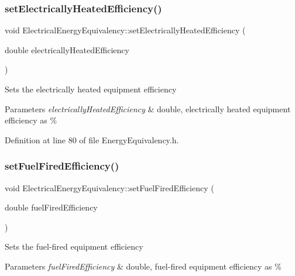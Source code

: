 \subsubsection{\texorpdfstring{set\+Electrically\+Heated\+Efficiency()}{setElectricallyHeatedEfficiency()}}
{\footnotesize\ttfamily void Electrical\+Energy\+Equivalency\+::set\+Electrically\+Heated\+Efficiency (\begin{DoxyParamCaption}\item[{double}]{electrically\+Heated\+Efficiency }\end{DoxyParamCaption})\hspace{0.3cm}{\ttfamily [inline]}}

Sets the electrically heated equipment efficiency


\begin{DoxyParams}{Parameters}
{\em electrically\+Heated\+Efficiency} & double, electrically heated equipment efficiency as \% \\
\hline
\end{DoxyParams}


Definition at line 80 of file Energy\+Equivalency.\+h.

\mbox{\label{class_electrical_energy_equivalency_ac73a4dadfeeff737a24b58e805ce9a3a}} 
\subsubsection{\texorpdfstring{set\+Fuel\+Fired\+Efficiency()}{setFuelFiredEfficiency()}}
{\footnotesize\ttfamily void Electrical\+Energy\+Equivalency\+::set\+Fuel\+Fired\+Efficiency (\begin{DoxyParamCaption}\item[{double}]{fuel\+Fired\+Efficiency }\end{DoxyParamCaption})\hspace{0.3cm}{\ttfamily [inline]}}

Sets the fuel-\/fired equipment efficiency


\begin{DoxyParams}{Parameters}
{\em fuel\+Fired\+Efficiency} & double, fuel-\/fired equipment efficiency as \% \\
\hline
\end{DoxyParams}


